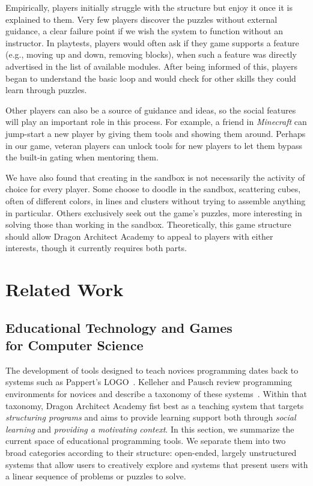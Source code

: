 \documentclass{sig-alternate}
\newcommand{\gametitle}{{\color{RoyalPurple} Dragon Architect Academy}}
\begin{document}
Empirically, players initially struggle with the structure but enjoy it once it is explained to them.
Very few players discover the puzzles without external guidance, a clear failure point if we wish the system to function without an instructor.
In playtests, players would often ask if they game supports a feature (e.g., moving up and down, removing blocks), when such a feature was directly advertised in the list of available modules.
After being informed of this, players began to understand the basic loop and would check for other skills they could learn through puzzles.

Other players can also be a source of guidance and ideas, so the social features will play an important role in this process.
For example, a friend in \emph{Minecraft} can jump-start a new player by giving them tools and showing them around.
Perhaps in our game, veteran players can unlock tools for new players to let them bypass the built-in gating when mentoring them.

We have also found that creating in the sandbox is not necessarily the activity of choice for every player. 
Some choose to doodle in the sandbox, scattering cubes, often of different colors, in lines and clusters without trying to assemble anything in particular.
Others exclusively seek out the game's puzzles, more interesting in solving those than working in the sandbox.
Theoretically, this game structure should allow \gametitle{} to appeal to players with either interests, though it currently requires both parts.

\section{Related Work}

\subsection{Educational Technology and Games\\for Computer Science}

The development of tools designed to teach novices programming dates back to systems such as Pappert's LOGO~\cite{papert80mindstorms}.
Kelleher and Pausch review programming environments for novices and describe a taxonomy of these systems~\cite{kelleher2005lowering}.
Within that taxonomy, \gametitle{} fist best as a teaching system that targets \emph{structuring programs} and aims to provide learning support both through \emph{social learning} and \emph{providing a motivating context}. 
In this section, we summarize the current space of educational programming tools. 
We separate them into two broad categories according to their structure: open-ended, largely unstructured systems that allow users to creatively explore and systems that present users with a linear sequence of problems or puzzles to solve. 
\end{document}
